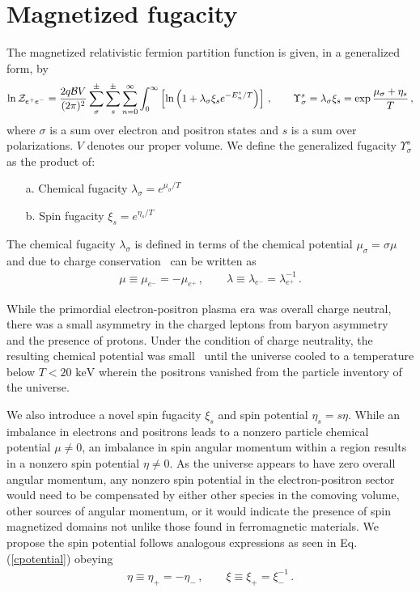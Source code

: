\documentclass[a4paper]{article}
\newcommand*{\keV}{\text{ keV}}
\newcommand{\req}[1]{Eq.\,(\ref{#1})}
\begin{document}
\section{Magnetized fugacity}
\label{sec:fugacity}
\noindent The magnetized relativistic fermion partition function is given, in a generalized form, by
\begin{align}
    \label{partition}
    \ln{\cal Z}_{e^{+}e^{-}}=\frac{2q{\cal B}V}{(2\pi)^{2}}\sum_{\sigma}^{\pm}\sum_{s}^{\pm}\sum_{n=0}^{\infty}\int_{0}^{\infty}\left[\ln\left(1+\lambda_{\sigma}\xi_{s}e^{-E_{n}^{s}/T}\right)\right]\,,\qquad\Upsilon_{\sigma}^{s}=\lambda_{\sigma}\xi_{s}=\exp{\frac{\mu_{\sigma}+\eta_{s}}{T}}\,,
\end{align}
where $\sigma$ is a sum over electron and positron states and $s$ is a sum over polarizations. $V$ denotes our proper volume. We define the generalized fugacity $\Upsilon_{\sigma}^{s}$ as the product of:
\begin{itemize}
    \item[a.] Chemical fugacity $\lambda_{\sigma}=e^{\mu_{\sigma}/T}$
    \item[b.] Spin fugacity $\xi_{s}=e^{\eta_{s}/T}$
\end{itemize}
The chemical fugacity $\lambda_{\sigma}$ is defined in terms of the chemical potential $\mu_{\sigma}=\sigma\mu$ and due to charge conservation~\cite{elze1980relativistic} can be written as 
\begin{align}
    \label{cpotential}
    \mu\equiv\mu_{e^{-}}=-\mu_{e^{+}}\,,\qquad
    \lambda\equiv\lambda_{e^{-}}=\lambda_{e^{+}}^{-1}\,.
\end{align}

While the primordial electron-positron plasma era was overall charge neutral, there was a small asymmetry in the charged leptons from baryon asymmetry~\cite{canetti2012matter} and the presence of protons. Under the condition of charge neutrality, the resulting chemical potential was small~\cite{rafelski2023short} until the universe cooled to a temperature below $T<20\keV$ wherein the positrons vanished from the particle inventory of the universe.

We also introduce a novel spin fugacity $\xi_{s}$ and spin potential $\eta_{s}=s\eta$. While an imbalance in electrons and positrons leads to a nonzero particle chemical potential $\mu\neq0$, an imbalance in spin angular momentum within a region results in a nonzero spin potential $\eta\neq0$. As the universe appears to have zero overall angular momentum, any nonzero spin potential in the electron-positron sector would need to be compensated by either other species in the comoving volume, other sources of angular momentum, or it would indicate the presence of spin magnetized domains not unlike those found in ferromagnetic materials. We propose the spin potential follows analogous expressions as seen in \req{cpotential} obeying
\begin{align}
    \label{spotential}
    \eta\equiv\eta_{+}=-\eta_{-}\,,\qquad
    \xi\equiv\xi_{+}=\xi_{-}^{-1}\,.
\end{align}
\end{document}
